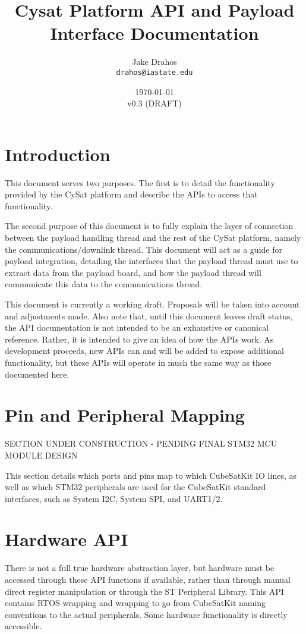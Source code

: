 \documentclass[10pt]{extarticle}
\begin{document}
\title{Cysat Platform API and Payload Interface Documentation}
\author{Jake Drahos \\ \texttt{drahos@iastate.edu}}
\date{\today\\v0.3 (DRAFT)}

\maketitle

\tableofcontents

\section{Introduction}
This document serves two purposes. The first is to detail the functionality 
provided by the CySat platform and
describe the APIs to access that functionality.

The second purpose of this document is to fully explain the layer of connection
between the payload handling thread and the rest of the CySat platform, namely
the communications/downlink thread. This document will act as a guide for
payload integration, detailing the interfaces that the payload thread must
 use
to extract data from the payload board, and how the payload thread will 
communicate this data to the communications thread.

This document is currently a working draft. Proposals will be taken into account
and adjustments made. Also note that, until this document leaves draft status,
the API documentation is not intended to be an exhaustive or canonical
reference. Rather, it is intended to give an idea of how the APIs work. As
development proceeds, new APIs can and will be added to expose additional
functionality, but these APIs will operate in much the same way as those
documented here.

\section{Pin and Peripheral Mapping}

SECTION UNDER CONSTRUCTION - PENDING FINAL STM32 MCU MODULE DESIGN

This section details which ports and pins map to which CubeSatKit IO lines,
as well as which STM32 peripherals are used for the CubeSatKit standard 
interfaces, such as System I2C, System SPI, and UART1/2.

\section{Hardware API}
There is not a full true hardware abstraction layer, but hardware must be
accessed through these API functions if available, rather than through manual
direct register manipulation or through the ST Peripheral Library. This API
contains RTOS wrapping and wrapping to go from CubeSatKit naming conventions
to the actual peripherals. Some hardware functionality is directly accessible.
\\
\end{document}
